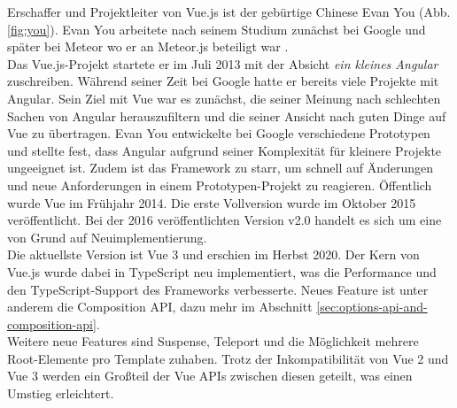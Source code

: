 Erschaffer und Projektleiter von Vue.js ist der gebürtige Chinese Evan You (Abb. \ref{fig:you}).
Evan You arbeitete nach seinem Studium zunächst bei Google und später bei Meteor wo er
an Meteor.js beteiligt war \cite{linkedinYou}.
\\
Das Vue.js-Projekt startete er im Juli 2013 mit der Absicht \emph{ ein kleines Angular}
zuschreiben.
Während seiner Zeit bei Google hatte er bereits viele Projekte mit Angular.
Sein Ziel mit Vue war es zunächst, die seiner Meinung nach schlechten Sachen von Angular herauszufiltern
und die seiner Ansicht nach guten Dinge auf Vue zu übertragen.
Evan You entwickelte bei Google verschiedene Prototypen und stellte fest,
dass Angular aufgrund seiner Komplexität für kleinere Projekte ungeeignet ist.
Zudem ist das Framework zu starr, um schnell auf Änderungen und neue Anforderungen in einem Prototypen-Projekt zu reagieren.
Öffentlich wurde Vue im Frühjahr 2014.
Die erste Vollversion wurde im Oktober 2015 veröffentlicht.
Bei der 2016 veröffentlichten Version v2.0 handelt es sich um eine von Grund auf Neuimplementierung. \cite[1:11-4:42]{vueNYC}
\\
Die aktuellste Version ist Vue 3 und erschien im Herbst 2020.
Der Kern von Vue.js wurde dabei in TypeScript neu implementiert, was die Performance und den TypeScript-Support des Frameworks verbesserte.
Neues Feature ist unter anderem die Composition API, dazu mehr im Abschnitt \ref{sec:options-api-and-composition-api}. \cite{konstantinidis2020}
\\
Weitere neue Features sind Suspense, Teleport und die Möglichkeit mehrere Root-Elemente pro Template zuhaben.
Trotz der Inkompatibilität von Vue 2 und Vue 3 werden ein Großteil der Vue APIs zwischen diesen geteilt,
was einen Umstieg erleichtert. \cite{vueFAQ}

